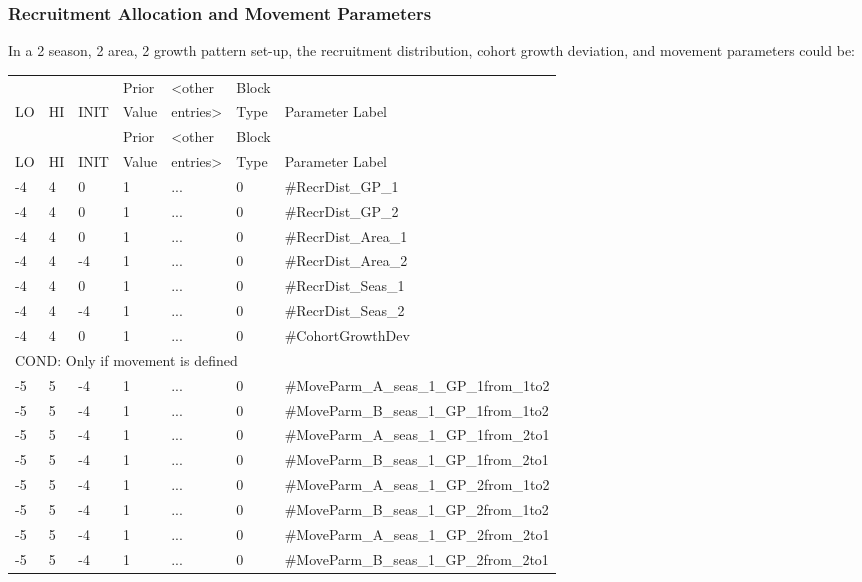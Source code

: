 \subsubsection{Recruitment Allocation and Movement Parameters}
In a 2 season, 2 area, 2 growth pattern set-up, the recruitment distribution, cohort growth deviation, and movement parameters could be:

\begin{center}
	\begin{longtable}{ p{0.7cm} p{0.7cm} p{0.7cm}  p{1cm}  p{1.1cm}  p{1cm}  p{8cm}  }
		\hline
		&  &  & Prior &  <other & Block &  \\
		LO & HI & INIT & Value &  entries> & Type & Parameter Label \\
		\hline
		\endfirsthead

		\hline
		&  &  & Prior &  <other & Block &  \\
		LO & HI & INIT & Value &  entries> & Type & Parameter Label \\
		\hline
		\endhead

		\endfoot

		\endlastfoot

		-4   & 4    & 0    & 1    & ... & 0 & \#RecrDist\_GP\_1\\
	    -4   & 4    & 0    & 1    & ... & 0 &  \#RecrDist\_GP\_2\\
		-4   & 4    & 0    & 1    & ... & 0 &  \#RecrDist\_Area\_1 \\
		-4   & 4    & -4   & 1    & ... & 0 &  \#RecrDist\_Area\_2 \\
		-4   & 4    & 0    & 1    & ... & 0 &  \#RecrDist\_Seas\_1 \\
		-4   & 4    & -4   & 1    & ... & 0 &  \#RecrDist\_Seas\_2 \\
		-4   & 4    & 0    & 1    & ... & 0 & \#CohortGrowthDev \\
		\multicolumn{7}{l}{COND: Only if movement is defined} \\
		-5   & 5    & -4   & 1    & ... & 0 & \#MoveParm\_A\_seas\_1\_GP\_1from\_1to2 \\
		-5   & 5    & -4   & 1    & ... & 0 & \#MoveParm\_B\_seas\_1\_GP\_1from\_1to2 \\
		-5   & 5    & -4   & 1    & ... & 0 & \#MoveParm\_A\_seas\_1\_GP\_1from\_2to1 \\
		-5   & 5    & -4   & 1    & ... & 0 & \#MoveParm\_B\_seas\_1\_GP\_1from\_2to1 \\
		-5   & 5    & -4   & 1    & ... & 0 & \#MoveParm\_A\_seas\_1\_GP\_2from\_1to2 \\
		-5   & 5    & -4   & 1    & ... & 0 & \#MoveParm\_B\_seas\_1\_GP\_2from\_1to2 \\
		-5   & 5    & -4   & 1    & ... & 0 & \#MoveParm\_A\_seas\_1\_GP\_2from\_2to1 \\
		-5   & 5    & -4   & 1    & ... & 0 & \#MoveParm\_B\_seas\_1\_GP\_2from\_2to1 \\
		\hline
	\end{longtable}
\end{center}

